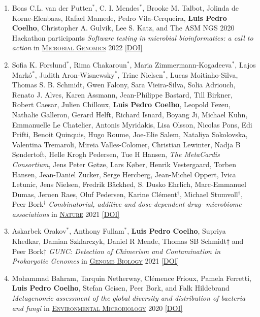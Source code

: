 \documentclass{article}
\newcommand\showdoi[1]{%
    \href{https://doi.org/#1}{[DOI]}%
}
\newcommand\pubname[1]{\textsc{\uline{#1}}}
\newcommand\costar{${}^{*}$}
\newcommand\cosenior{${}^{\dagger}$}
\begin{document}
\begin{enumerate}[resume]
\item Boas C.L. van der Putten\costar, C. I. Mendes\costar, Brooke M. Talbot, Jolinda de Korne-Elenbaas, Rafael Mamede, Pedro Vila-Cerqueira, \textbf{Luis Pedro Coelho},  Christopher A. Gulvik, Lee S. Katz, and The ASM NGS 2020 Hackathon participants \emph{Software testing in microbial bioinformatics: a call to action} in \pubname{Microbial Genomics} 2022 \showdoi{10.1099/mgen.0.000790}

\item Sofia K. Forslund\costar, Rima Chakaroun\costar, Maria
Zimmermann-Kogadeeva\costar, Lajos Markó\costar, Judith Aron-Wisnewsky\costar,
Trine Nielsen\costar, Lucas Moitinho-Silva, Thomas S. B.  Schmidt, Gwen Falony,
Sara Vieira-Silva, Solia Adriouch, Renato J. Alves, Karen Assmann,
Jean-Philippe Bastard, Till Birkner, Robert Caesar, Julien Chilloux,
\textbf{Luis Pedro Coelho}, Leopold Fezeu, Nathalie Galleron, Gerard Helft,
Richard Isnard, Boyang Ji, Michael Kuhn, Emmanuelle Le Chatelier, Antonis
Myridakis, Lisa Olsson, Nicolas Pons, Edi Prifti, Benoit Quinquis, Hugo Roume,
Joe-Elie Salem, Nataliya Sokolovska, Valentina Tremaroli, Mireia
Valles-Colomer, Christian Lewinter, Nadja B Søndertoft, Helle Krogh Pedersen,
Tue H Hansen, \textit{The MetaCardis Consortium}, Jens Peter Gøtze, Lars Køber,
Henrik Vestergaard, Torben Hansen, Jean-Daniel Zucker, Serge
Hercberg, Jean-Michel Oppert, Ivica Letunic, Jens Nielsen, Fredrik Bäckhed, S.
Dusko Ehrlich, Marc-Emmanuel Dumas, Jeroen Raes, Oluf Pedersen, Karine
Clément\cosenior, Michael Stumvoll\cosenior, Peer Bork\cosenior
\emph{Combinatorial, additive and dose-dependent drug- microbiome associations}
in \pubname{Nature} 2021 \showdoi{10.1038/s41586-021-04177-9}

\item Askarbek Orakov\costar, Anthony Fullam\costar, \textbf{Luis Pedro
Coelho}, Supriya Khedkar, Damian Szklarczyk, Daniel R Mende, Thomas SB Schmidt†
and Peer Bork† \emph{GUNC: Detection of Chimerism and Contamination in
Prokaryotic Genomes} in \pubname{Genome Biology} 2021
\showdoi{10.1186/s13059-021-02393-0}

\item Mohammad Bahram, Tarquin Netherway, Clémence Frioux, Pamela Ferretti,
\textbf{Luis Pedro Coelho}, Stefan Geisen, Peer Bork, and Falk Hildebrand
\emph{Metagenomic assessment of the global diversity and distribution of
bacteria and fungi} in \pubname{Environmental Microbiology} 2020
\showdoi{10.1111/1462-2920.15314}


\end{enumerate}
\end{document}
